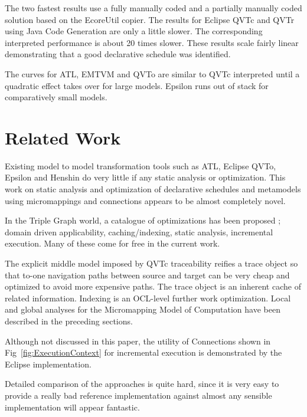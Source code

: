 \documentclass{llncs}
\begin{document}
The two fastest results use a fully manually coded and a partially manually coded solution based on the EcoreUtil copier. The results for Eclipse QVTc and QVTr using Java Code Generation are only a little slower.
The corresponding interpreted performance is about 20 times slower. These results scale fairly linear demonstrating that a good declarative schedule was identified.

The curves for ATL, EMTVM and QVTo are similar to QVTc interpreted until a quadratic effect takes over for large models.
Epsilon runs out of stack for comparatively small models.

\section{Related Work}\label{Related Work}

Existing model to model transformation tools such as ATL, Eclipse QVTo, Epsilon and Henshin \cite{Eclipse-Henshin} do very little if any static analysis or optimization. This work on static analysis and optimization of declarative schedules and metamodels using micromappings and connections appears to be almost completely novel. 

In the Triple Graph world, a catalogue of optimizations has been proposed \cite{TGG-Optimization}; domain driven applicability, caching/indexing, static analysis, incremental execution. Many of these come for free in the current work.

The explicit middle model imposed by QVTc traceability reifies a trace object so that to-one navigation paths between source and target can be very cheap and optimized to avoid more expensive paths.
The trace object is an inherent cache of related information. Indexing is an OCL-level further work optimization. Local and global analyses for the Micromapping Model of Computation have been described in the preceding sections.


Although not discussed in this paper, the utility of Connections shown in Fig~\ref{fig:ExecutionContext} for incremental execution is demonstrated by the Eclipse implementation.

Detailed comparison of the approaches is quite hard, since it is very easy to provide a really bad reference implementation against almost any sensible implementation will appear fantastic.
\end{document}
